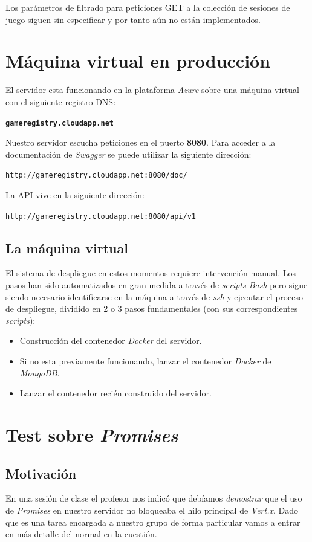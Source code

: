 Los parámetros de filtrado para peticiones GET a la colección
de sesiones de juego siguen sin especificar y por tanto aún
no están implementados.


\section{Máquina virtual en producción}

El servidor esta funcionando en la plataforma \emph{Azure} sobre
una máquina virtual con el siguiente registro DNS:

\textbf{\texttt{gameregistry.cloudapp.net}}

Nuestro servidor escucha peticiones en el puerto \textbf{8080}.
Para acceder a la documentación de \emph{Swagger} se puede utilizar
la siguiente dirección:

\texttt{http://gameregistry.cloudapp.net:8080/doc/}

La API vive en la siguiente dirección:

\texttt{http://gameregistry.cloudapp.net:8080/api/v1}


\subsection{La máquina virtual}
El sistema de despliegue en estos momentos requiere intervención
manual. Los pasos han sido automatizados en gran medida a través
de \emph{scripts Bash} pero sigue siendo necesario identificarse
en la máquina a través de \emph{ssh} y ejecutar el proceso de
despliegue, dividido en 2 o 3 pasos fundamentales (con sus 
correspondientes \emph{scripts}):

\begin{itemize}
 \item Construcción del contenedor \emph{Docker} del servidor.
 \item Si no esta previamente funcionando, lanzar el contenedor 
       \emph{Docker} de \emph{MongoDB}.
 \item Lanzar el contenedor recién construido del servidor.
\end{itemize}


\section{Test sobre \emph{Promises}}
\subsection{Motivación}
En una sesión de clase el profesor nos indicó que debíamos \emph{demostrar}
que el uso de \emph{Promises} en nuestro servidor no bloqueaba el hilo principal
de \emph{Vert.x}. Dado que es una tarea encargada a nuestro
grupo de forma particular vamos a entrar en más detalle del normal en 
la cuestión.

